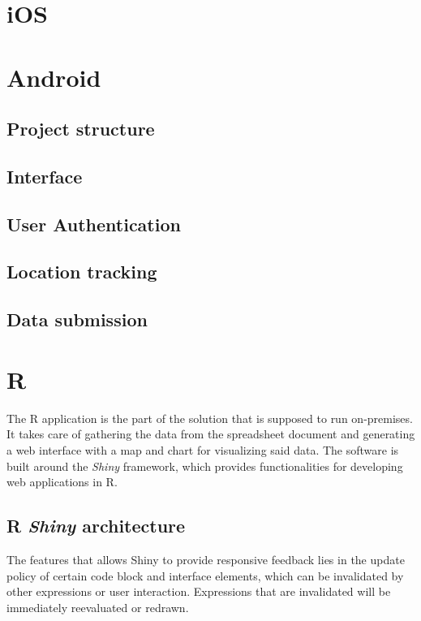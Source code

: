 \section{iOS}



\section{Android}


\subsection{Project structure}

\subsection{Interface}


\subsection{User Authentication}


\subsection{Location tracking}


\subsection{Data submission}



\section{R}
The R application is the part of the solution that is supposed to run on-premises.
It takes care of gathering the data from the spreadsheet document and generating a web interface with a map and chart for visualizing said data.
The software is built around the \emph{Shiny} framework, which provides functionalities for developing web applications in R.


\subsection{R \emph{Shiny} architecture}
The features that allows Shiny to provide responsive feedback lies in the update policy of certain code block and interface elements, which can be invalidated by other expressions or user interaction.
Expressions that are invalidated will be immediately reevaluated or redrawn.

